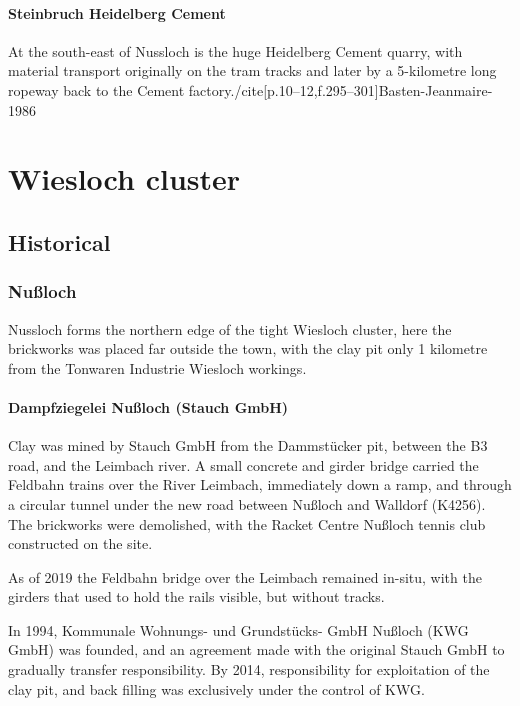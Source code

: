 \documentclass[a4paper]{report}
\begin{document}
\subsection{Steinbruch Heidelberg Cement}

At the south-east of Nussloch is the huge Heidelberg Cement quarry,
with material transport originally on the tram tracks and later by a
5-kilometre long ropeway back to the Cement factory./cite[p.10--12,f.295--301]{Basten-Jeanmaire-1986}

\part{Wiesloch cluster}

\chapter{Historical}

\section{Nußloch}

Nussloch forms the northern edge of the tight Wiesloch cluster, here
the brickworks was placed far outside the town, with the clay pit only
1 kilometre from the Tonwaren Industrie Wiesloch workings.

\subsection{Dampfziegelei Nußloch (Stauch GmbH)}

Clay was mined by Stauch GmbH from the Dammstücker pit, between the B3 road, and the
Leimbach river.  A small concrete and girder bridge carried the
Feldbahn trains over the River Leimbach, immediately down a ramp, and
through a circular tunnel under the new road between Nußloch and Walldorf
(K4256).  The brickworks were demolished, with the Racket Centre Nußloch
tennis club constructed on the site.

As of 2019 the Feldbahn bridge over the Leimbach remained in-situ, with the
girders that used to hold the rails visible, but without tracks.

In 1994, Kommunale Wohnungs- und Grundstücks- GmbH Nußloch (KWG GmbH)
was founded, and an agreement made with the original Stauch GmbH to
gradually transfer responsibility.  By 2014, responsibility for
exploitation of the clay pit, and back filling was exclusively under
the control of KWG.\cite{KWG-History}
\end{document}
